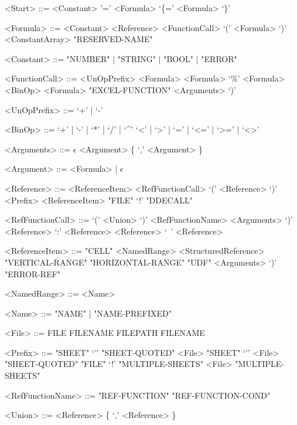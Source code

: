 \begin{grammar}
	<Start> ::= <Constant>
	\alt '=' <Formula>
	\alt `\{=' <Formula> `\}'
	
	<Formula> ::= <Constant>
	\alt <Reference>
	\alt <FunctionCall>
	\alt `(' <Formula> `)'
	\alt <ConstantArray>
	\alt "RESERVED-NAME"
	
	<Constant> ::= "NUMBER" | "STRING" | "BOOL" | "ERROR"
	
	<FunctionCall> ::= 
	<UnOpPrefix> <Formula>
	\alt <Formula> `\%'
	\alt <Formula> <BinOp> <Formula>
	\alt "EXCEL-FUNCTION" <Arguments> `)'
	
	<UnOpPrefix> ::= `+' | `-'
	
	<BinOp> ::= `+' | `-' | `*' | `/' | `\textasciicircum'
	\alt `<' | `>' | `=' | `<=' | `>=' | `<>'
	
	
	<Arguments> ::= $\epsilon$ \alt <Argument> \{ `,' <Argument> \}
	
	<Argument> ::= <Formula> | $\epsilon$
	
	<Reference> ::= <ReferenceItem>
	\alt <RefFunctionCall>
	\alt `(' <Reference> `)' 
	\alt <Prefix> <ReferenceItem>
	\alt "FILE" `!' "DDECALL"
	
	
	<RefFunctionCall> ::= `(' <Union> `)'
	\alt <RefFunctionName> <Arguments> `)'
	\alt <Reference> `:' <Reference>
	\alt <Reference> `\ ' <Reference>
	
	<ReferenceItem> ::= "CELL"
	\alt <NamedRange>
	\alt <StructuredReference>
	\alt "VERTICAL-RANGE"
	\alt "HORIZONTAL-RANGE"
	\alt "UDF" <Arguments> `)'
	\alt "ERROR-REF"
	
	\columnbreak
	
	<NamedRange> ::= <Name>
		
	<Name> ::= "NAME" | "NAME-PREFIXED"
	
	<File> ::= FILE
	\alt FILENAME
	\alt FILEPATH FILENAME
	
	<Prefix> ::= "SHEET"
	\alt `'' "SHEET-QUOTED"
	\alt <File> "SHEET"
	\alt `'' <File> "SHEET-QUOTED"
	\alt "FILE" `!'
	\alt "MULTIPLE-SHEETS"
	\alt <File> "MULTIPLE-SHEETS"
	
	<RefFunctionName> ::= "REF-FUNCTION"
	\alt "REF-FUNCTION-COND"
	
	<Union> ::= <Reference> \{ `,' <Reference> \}
	

\end{grammar}

